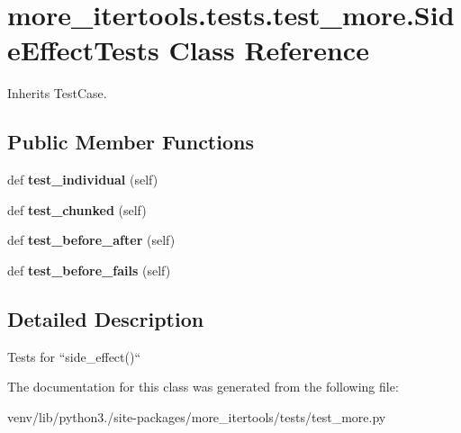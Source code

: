 \hypertarget{classmore__itertools_1_1tests_1_1test__more_1_1_side_effect_tests}{}\section{more\+\_\+itertools.\+tests.\+test\+\_\+more.\+Side\+Effect\+Tests Class Reference}
\label{classmore__itertools_1_1tests_1_1test__more_1_1_side_effect_tests}


Inherits Test\+Case.

\subsection*{Public Member Functions}
\begin{DoxyCompactItemize}
\item 
\mbox{\label{classmore__itertools_1_1tests_1_1test__more_1_1_side_effect_tests_a17bfbce27f1ace2c97989237d03e6866}} 
def {\bfseries test\+\_\+individual} (self)
\item 
\mbox{\label{classmore__itertools_1_1tests_1_1test__more_1_1_side_effect_tests_aed330ea7faee4914e9971dc75a8ed9b5}} 
def {\bfseries test\+\_\+chunked} (self)
\item 
\mbox{\label{classmore__itertools_1_1tests_1_1test__more_1_1_side_effect_tests_a8e4a23346a70bfe831a0a243273362e8}} 
def {\bfseries test\+\_\+before\+\_\+after} (self)
\item 
\mbox{\label{classmore__itertools_1_1tests_1_1test__more_1_1_side_effect_tests_ae311579a8839c246dc03a9b3028f1667}} 
def {\bfseries test\+\_\+before\+\_\+fails} (self)
\end{DoxyCompactItemize}


\subsection{Detailed Description}
\begin{DoxyVerb}Tests for ``side_effect()``\end{DoxyVerb}
 

The documentation for this class was generated from the following file\+:\begin{DoxyCompactItemize}
\item 
venv/lib/python3./site-\/packages/more\+\_\+itertools/tests/test\+\_\+more.\+py\end{DoxyCompactItemize}
